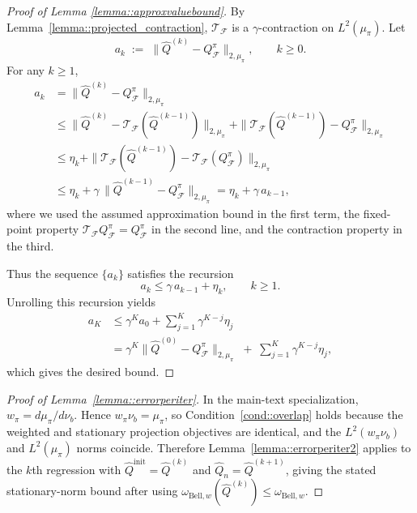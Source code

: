 \documentclass{article}
\theoremstyle{plain}
\theoremstyle{definition}
\theoremstyle{remark}
\begin{document}
\begin{proof}[Proof of Lemma \ref{lemma::approxvaluebound}]
By Lemma~\ref{lemma::projected_contraction}, $\mathcal{T}_{\mathcal{F}}$ is a
$\gamma$-contraction on $L^2({\mu_\pi})$. Let
\[
a_k \;:=\; \|\hat{Q}^{(k)} - Q^\pi_{\mathcal{F}}\|_{2,{\mu_\pi}},
\qquad k \ge 0.
\]
For any $k \ge 1$,
\begin{align*}
a_k
&= \|\hat{Q}^{(k)} - Q^\pi_{\mathcal{F}}\|_{2,{\mu_\pi}} \\
&\le \|\hat{Q}^{(k)} - \mathcal{T}_{\mathcal{F}}(\hat{Q}^{(k-1)})\|_{2,{\mu_\pi}}
    + \|\mathcal{T}_{\mathcal{F}}(\hat{Q}^{(k-1)}) - Q^\pi_{\mathcal{F}}\|_{2,{\mu_\pi}} \\
&\le \eta_k + \|\mathcal{T}_{\mathcal{F}}(\hat{Q}^{(k-1)}) - \mathcal{T}_{\mathcal{F}}(Q^\pi_{\mathcal{F}})\|_{2,{\mu_\pi}} \\
&\le \eta_k + \gamma\,\|\hat{Q}^{(k-1)} - Q^\pi_{\mathcal{F}}\|_{2,{\mu_\pi}}
= \eta_k + \gamma\,a_{k-1},
\end{align*}
where we used the assumed approximation bound in the first term, the fixed-point
property $\mathcal{T}_{\mathcal{F}} Q^\pi_{\mathcal{F}} = Q^\pi_{\mathcal{F}}$ in the second line,
and the contraction property in the third.

Thus the sequence $\{a_k\}$ satisfies the recursion
\[
a_k \le \gamma\,a_{k-1} + \eta_k, \qquad k \ge 1.
\]
Unrolling this recursion yields
\begin{align*}
    a_K
&\le
\gamma^K a_0 + \sum_{j=1}^K \gamma^{K-j} \eta_j\\ 
& = 
\gamma^K \|\hat{Q}^{(0)} - Q^\pi_{\mathcal{F}}\|_{2,{\mu_\pi}}
\;+\;
\sum_{j=1}^K \gamma^{K-j} \eta_j,
\end{align*}
which gives the desired bound.
\end{proof}


\begin{proof}[Proof of Lemma~\ref{lemma::errorperiter}]
In the main-text specialization, \(w_\pi=d\mu_\pi/d\nu_b\). Hence
\(w_\pi\nu_b=\mu_\pi\), so Condition~\ref{cond::overlap} holds because the
weighted and stationary projection objectives are identical, and the
\(L^2(w_\pi\nu_b)\) and \(L^2(\mu_\pi)\) norms coincide. Therefore
Lemma~\ref{lemma::errorperiter2} applies to the \(k\)th regression with
\(\hat Q^{\mathrm{init}}=\widehat Q^{(k)}\) and
\(\hat Q_n=\widehat Q^{(k+1)}\), giving the stated stationary-norm bound after
using
\(\omega_{\mathrm{Bell},w}(\widehat Q^{(k)})\le\omega_{\mathrm{Bell},w}\).
\end{proof}
\end{document}

